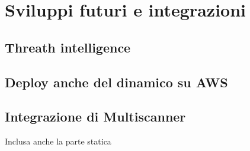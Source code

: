 \chapter{Sviluppi futuri e integrazioni}

\section{Threath intelligence}

\section{Deploy anche del dinamico su AWS}

\section{Integrazione di Multiscanner}
Inclusa anche la parte statica